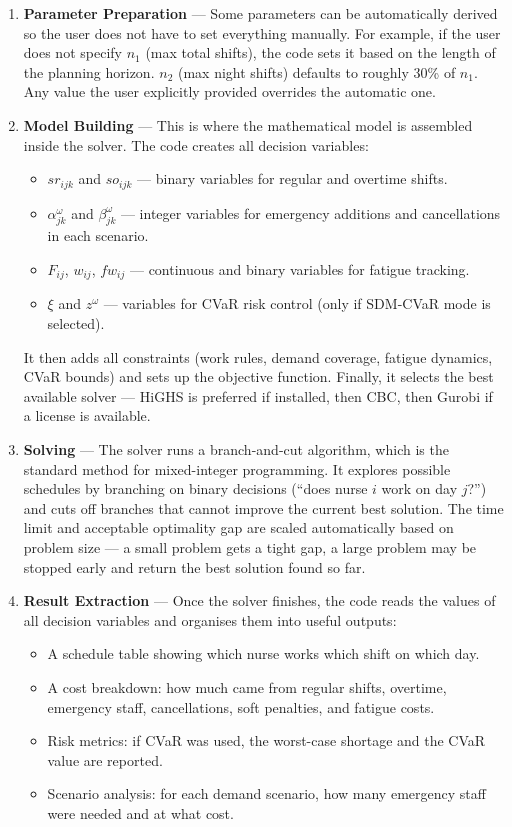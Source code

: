 \documentclass[12pt,a4paper]{article}
\begin{document}
\begin{enumerate}[leftmargin=20pt, itemsep=8pt,
    label=\colorbox{navyblue}{\color{white}\small\bfseries\arabic*.}]
  \item \textbf{Parameter Preparation} — Some parameters can be automatically derived so the user does not have to set everything manually. For example, if the user does not specify $n_1$ (max total shifts), the code sets it based on the length of the planning horizon. $n_2$ (max night shifts) defaults to roughly 30\% of $n_1$. Any value the user explicitly provided overrides the automatic one.

  \item \textbf{Model Building} — This is where the mathematical model is assembled inside the solver. The code creates all decision variables:
    \begin{itemize}[itemsep=3pt]
      \item $sr_{ijk}$ and $so_{ijk}$ — binary variables for regular and overtime shifts.
      \item $\alpha_{jk}^{\omega}$ and $\beta_{jk}^{\omega}$ — integer variables for emergency additions and cancellations in each scenario.
      \item $F_{ij}$, $w_{ij}$, $fw_{ij}$ — continuous and binary variables for fatigue tracking.
      \item $\xi$ and $z^{\omega}$ — variables for CVaR risk control (only if SDM-CVaR mode is selected).
    \end{itemize}
    It then adds all constraints (work rules, demand coverage, fatigue dynamics, CVaR bounds) and sets up the objective function. Finally, it selects the best available solver — HiGHS is preferred if installed, then CBC, then Gurobi if a license is available.

  \item \textbf{Solving} — The solver runs a branch-and-cut algorithm, which is the standard method for mixed-integer programming. It explores possible schedules by branching on binary decisions (``does nurse $i$ work on day $j$?'') and cuts off branches that cannot improve the current best solution. The time limit and acceptable optimality gap are scaled automatically based on problem size — a small problem gets a tight gap, a large problem may be stopped early and return the best solution found so far.

  \item \textbf{Result Extraction} — Once the solver finishes, the code reads the values of all decision variables and organises them into useful outputs:
    \begin{itemize}[itemsep=3pt]
      \item A schedule table showing which nurse works which shift on which day.
      \item A cost breakdown: how much came from regular shifts, overtime, emergency staff, cancellations, soft penalties, and fatigue costs.
      \item Risk metrics: if CVaR was used, the worst-case shortage and the CVaR value are reported.
      \item Scenario analysis: for each demand scenario, how many emergency staff were needed and at what cost.
    \end{itemize}


\end{enumerate}
\end{document}
